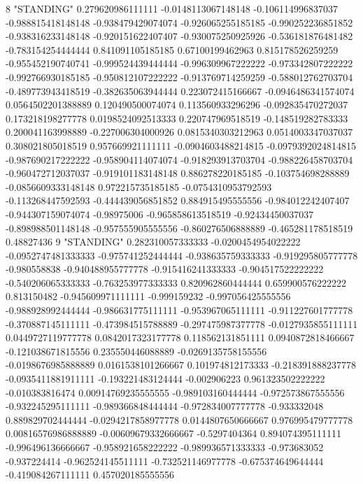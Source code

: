 8 "STANDING" 0.279620986111111 -0.0148113067148148 -0.106114996837037 -0.988815418148148 -0.938479429074074 -0.926065255185185 -0.990252236851852 -0.938316233148148 -0.920151622407407 -0.930075250925926 -0.536181876481482 -0.783154254444444 0.841091105185185 0.67100199462963 0.815178526259259 -0.955452190740741 -0.999524439444444 -0.996309967222222 -0.973342807222222 -0.992766930185185 -0.950812107222222 -0.913769714259259 -0.588012762703704 -0.489773943418519 -0.382635063944444 0.223072415166667 -0.0946486341574074 0.0564502201388889 0.120490500074074 0.113560933296296 -0.092835470272037 0.173218198277778 0.0198524092513333 0.220747969518519 -0.148519282783333 0.200041163998889 -0.227006304000926 0.0815340303212963 0.0514003347037037 0.308021805018519 0.957669921111111 -0.0904603488214815 -0.0979392024814815 -0.987690217222222 -0.958904114074074 -0.918293913703704 -0.988226458703704 -0.960472712037037 -0.919101183148148 0.886278220185185 -0.103754698288889 -0.0856609333148148 0.972215735185185 -0.0754310953792593 -0.113268447592593 -0.444439056851852 0.884915495555556 -0.984012242407407 -0.944307159074074 -0.98975006 -0.965858613518519 -0.92434450037037 -0.898988501148148 -0.957555905555556 -0.860276506888889 -0.465281178518519 0.48827436
9 "STANDING" 0.282310057333333 -0.0200454954022222 -0.0952747481333333 -0.975741252444444 -0.938635759333333 -0.919295805777778 -0.980558838 -0.940488955777778 -0.915416241333333 -0.904517522222222 -0.540206065333333 -0.763253977333333 0.820962860444444 0.659900576222222 0.813150482 -0.945609971111111 -0.999159232 -0.997056425555556 -0.988928992444444 -0.986631775111111 -0.953967065111111 -0.911227601777778 -0.370887145111111 -0.473984515788889 -0.297475987377778 -0.0127935855111111 0.0449727119777778 0.0842017323177778 0.118562131851111 0.0940872818466667 -0.121038671815556 0.235550446088889 -0.0269135758155556 -0.0198676985888889 0.0161538101266667 0.101974812173333 -0.218391888237778 -0.0935411881911111 -0.193221483124444 -0.002906223 0.961323502222222 -0.010383816474 0.00914769235555555 -0.989103160444444 -0.972573867555556 -0.932245295111111 -0.989366848444444 -0.972834007777778 -0.933332048 0.889829702444444 -0.0294217858977778 0.0144807650666667 0.976995479777778 0.00816576986888889 -0.00609679332666667 -0.5297404364 0.894074395111111 -0.996496136666667 -0.958921658222222 -0.989936571333333 -0.973683052 -0.937224414 -0.962524145511111 -0.732521146977778 -0.675374649644444 -0.419084267111111 0.457020185555556
